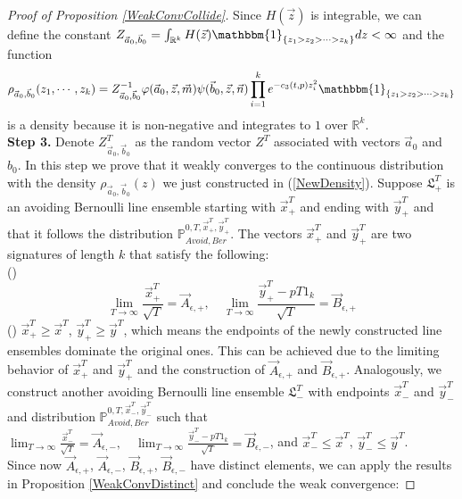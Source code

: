 \begin{proof}[Proof of Proposition \ref{WeakConvCollide}]
Since $H(\vec{z})$ is integrable, we can define the constant $Z_{\vec{a}_{0},\vec{b}_{0}}=\int_{\mathbb{R}^{k}}H(\vec{z})\mathbbm{1}_{\{z_1>z_2>\cdots>z_{k}\}}dz<\infty$ and the function \begin{align}{\label{NewDensity}}
	\rho_{\vec{a}_{0},\vec{b}_{0}}(z_{1},\cdots,z_{k})=Z_{\vec{a}_{0},\vec{b}_{0}}^{-1}\varphi(\vec{a}_{0},\vec{z},\vec{m})\psi(\vec{b}_{0},\vec{z},\vec{n})\prod_{i=1}^{k}e^{-c_{3}(t,p)z_{i}^{2}}\mathbbm{1}_{\{z_1>z_2>\cdots>z_{k}\}}
\end{align}
is a density because it is non-negative and integrates to $1$ over $\mathbb{R}^{k}$.\\
\textbf{Step 3. }Denote $Z^{T}_{\vec{a}_{0},\vec{b}_{0}}$ as the random vector $Z^{T}$ associated with vectors $\vec{a}_{0}$ and $b_{0}$. In this step we prove that it weakly converges to the continuous distribution with the density $\rho_{\vec{a}_{0},\vec{b}_{0}}(z)$ we just constructed in (\ref{NewDensity}). Suppose $\mathfrak{L}_{+}^{T}$ is an avoiding Bernoulli line ensemble starting with $\vec{x}^{T}_{+}$ and ending with $\vec{y}^{T}_{+}$ and that it follows the distribution $\mathbb{P}_{Avoid,Ber}^{0,T,\vec{x}^{T}_{+},\vec{y}^{T}_{+}}$. The vectors $\vec{x}^{T}_{+}$ and $\vec{y}^{T}_{+}$ are two signatures of length $k$ that satisfy the following:\\
()$$\lim_{T\rightarrow\infty}\frac{\vec{x}^{T}_{+}}{\sqrt{T}}=\vec{A}_{\epsilon,+},\quad \lim_{T\rightarrow\infty}\frac{\vec{y}^{T}_{+}-pT1_{k}}{\sqrt{T}}=\vec{B}_{\epsilon,+}$$
() $\vec{x}^{T}_{+}\geqslant \vec{x}^{T}$, $\vec{y}^{T}_{+}\geqslant \vec{y}^{T}$, which means the endpoints of the newly constructed line ensembles dominate the original ones. This can be achieved due to the limiting behavior of $\vec{x}^{T}_{+}$ and $\vec{y}^{T}_{+}$ and the construction of $\vec{A}_{\epsilon,+}$ and $\vec{B}_{\epsilon,+}$.
Analogously, we construct another avoiding Bernoulli line ensemble $\mathfrak{L}_{-}^{T}$ with endpoints $\vec{x}^{T}_{-}$ and $\vec{y}^{T}_{-}$ and distribution $\mathbb{P}_{Avoid,Ber}^{0,T,\vec{x}^{T}_{-},\vec{y}^{T}_{-}}$ such that $\lim_{T\rightarrow\infty}\frac{\vec{x}^{T}_{-}}{\sqrt{T}}=\vec{A}_{\epsilon,-},\quad \lim_{T\rightarrow\infty}\frac{\vec{y}^{T}_{-}-pT1_{k}}{\sqrt{T}}=\vec{B}_{\epsilon,-}$, and $\vec{x}^{T}_{-}\leqslant \vec{x}^{T}$, $\vec{y}^{T}_{-}\leqslant \vec{y}^{T}$.\\
Since now $\vec{A}_{\epsilon,+}$, $\vec{A}_{\epsilon,-}$, $\vec{B}_{\epsilon, +}$, $\vec{B}_{\epsilon,-}$ have distinct elements, we can apply the results in Proposition \ref{WeakConvDistinct} and conclude the weak convergence:

\end{proof}
